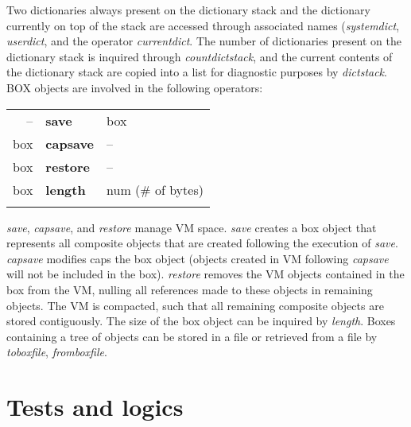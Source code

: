 Two  dictionaries  always  present  on  the  dictionary  stack  and   the dictionary   currently   on  top  of  the  stack  are   accessed   through associated  names  (\emph{systemdict}, \emph{userdict}, and the operator \emph{currentdict}.  The  number  of dictionaries present on the dictionary stack is inquired through \emph{countdictstack},  and the  current contents of the dictionary stack are copied into a  list  for diagnostic purposes by \emph{dictstack}.\\

\noindent BOX  objects are involved in the following operators:
\nopagebreak \\

\begin{tabular}{>{\sffamily}r>{\sffamily\bfseries}l>{\sffamily}l}
-- & save & box\\
box & capsave & --\\
box & restore & --\\
box & length & num (# of bytes)\\\\
\end{tabular}

\emph{save}, \emph{capsave}, and \emph{restore} manage VM space. \emph{save} creates a box object that represents all composite objects that are created following the execution of \emph{save}. \emph{capsave} modifies caps the box object (objects created in VM following \emph{capsave} will not be included in the box). \emph{restore} removes the VM objects contained in the box from the VM, nulling all references made to these objects in remaining objects. The VM is compacted, such that all remaining composite objects are stored contiguously. The size of the box object can be inquired by \emph{length}. Boxes containing a tree of objects can be stored in a file or retrieved from a file by \emph{toboxfile}, \emph{fromboxfile}.


\section{Tests and logics}

